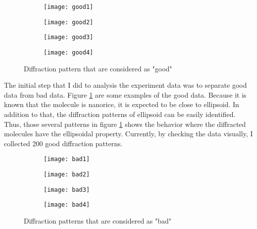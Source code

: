 \begin{figure}[ht]
\begin{subfigure}{.5\textwidth}
  \centering
  \texttt{[image: good1]}
\end{subfigure}
\begin{subfigure}{.5\textwidth}
  \centering
  \texttt{[image: good2]}
\end{subfigure}
\begin{subfigure}{.5\textwidth}
  \centering
  \texttt{[image: good3]}
\end{subfigure}
\begin{subfigure}{.5\textwidth}
  \centering
  \texttt{[image: good4]}
\end{subfigure}
\caption{Diffraction pattern that are considered as "good"}
\label{fig:gooddp1}
\end{figure}

The initial step that I did to analysis the experiment data was to separate good data from bad data. Figure \ref{fig:gooddp1} are some examples of the good data. Because it is known that the molecule is nanorice, it is expected to be close to ellipsoid. In addition to that, the diffraction patterns of ellipsoid can be easily identified. Thus, those several patterns in figure \ref{fig:gooddp1} shows the behavior where the diffracted molecules have the ellipsoidal property. Currently, by checking the data visually, I collected 200 good diffraction patterns.

\begin{figure}[ht]
\begin{subfigure}{.5\textwidth}
  \centering
  \texttt{[image: bad1]}
\end{subfigure}
\begin{subfigure}{.5\textwidth}
  \centering
  \texttt{[image: bad2]}
\end{subfigure}
\begin{subfigure}{.5\textwidth}
  \centering
  \texttt{[image: bad3]}
\end{subfigure}
\begin{subfigure}{.5\textwidth}
  \centering
  \texttt{[image: bad4]}
\end{subfigure}
\caption{Diffraction patterns that are considered as "bad"}
\label{fig:baddp1}
\end{figure}

